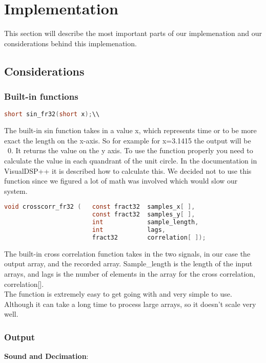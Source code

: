 \chapter{Implementation}
This section will describe the most important parts of our implemenation and our considerations behind this implemenation.\\
\section{Considerations}
\subsection{Built-in functions}
\begin{lstlisting}[language=C]
short sin_fr32(short x);\\
\end{lstlisting}
The built-in sin function takes in a value x, which represents time or to be more exact the length on the x-axis. So for example for x=3.1415 the output will be ~0. It returns the value on the y axis. To use the function properly you need to calculate the value in each quandrant of the unit circle. In the documentation in VisualDSP++ it is described how to calculate this. We decided not to use this function since we figured a lot of math was involved which would slow our system.

\begin{lstlisting}[language=C]
void crosscorr_fr32 (	const fract32  samples_x[ ], 
                     	const fract32  samples_y[ ],
                     	int            sample_length,
                     	int            lags,
                     	fract32        correlation[ ]);
\end{lstlisting}
The built-in cross correlation function takes in the two signals, in our case the output array, and the recorded array. Sample\_length is the length of the input arrays, and lags is the number of elements in the array for the cross correlation, correlation[].\\
The function is extremely easy to get going with and very simple to use. Although it can take a long time to process large arrays, so it doesn't scale very well.\\
\subsection{Output}
\textbf{Sound and Decimation}:\\


